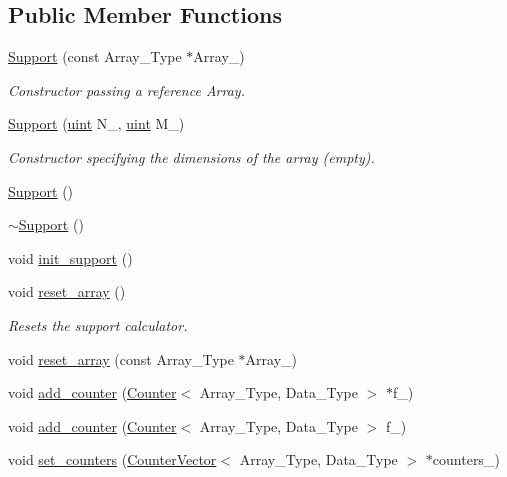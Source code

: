\subsection*{Public Member Functions}
\begin{DoxyCompactItemize}
\item 
\hyperlink{class_support_a4a0587bc6f1f268005a94fea039ea6ba}{Support} (const Array\+\_\+\+Type $\ast$Array\+\_\+)
\begin{DoxyCompactList}\small\item\em Constructor passing a reference Array. \end{DoxyCompactList}\item 
\hyperlink{class_support_aff7d2705d6f765fcbd8958453b7dbefe}{Support} (\hyperlink{typedefs_8hpp_a91ad9478d81a7aaf2593e8d9c3d06a14}{uint} N\+\_\+, \hyperlink{typedefs_8hpp_a91ad9478d81a7aaf2593e8d9c3d06a14}{uint} M\+\_\+)
\begin{DoxyCompactList}\small\item\em Constructor specifying the dimensions of the array (empty). \end{DoxyCompactList}\item 
\hyperlink{class_support_a8366d26b4fcd122cd9139fdee92729a5}{Support} ()
\item 
\hyperlink{class_support_a03228371869980fa356b7b86871d94e8}{$\sim$\+Support} ()
\item 
void \hyperlink{class_support_aef6fda6e7a0989f53fcd252609d770c9}{init\+\_\+support} ()
\item 
void \hyperlink{class_support_a831220076ece01ef72abce7c700b6d9b}{reset\+\_\+array} ()
\begin{DoxyCompactList}\small\item\em Resets the support calculator. \end{DoxyCompactList}\item 
void \hyperlink{class_support_a4b3c832b8a6e84638ff89f346d0454cf}{reset\+\_\+array} (const Array\+\_\+\+Type $\ast$Array\+\_\+)
\item 
void \hyperlink{class_support_a0ad8bb6202451253697d771a28859210}{add\+\_\+counter} (\hyperlink{class_counter}{Counter}$<$ Array\+\_\+\+Type, Data\+\_\+\+Type $>$ $\ast$f\+\_\+)
\item 
void \hyperlink{class_support_aa8680937a0237286a8b0401bca07cbf6}{add\+\_\+counter} (\hyperlink{class_counter}{Counter}$<$ Array\+\_\+\+Type, Data\+\_\+\+Type $>$ f\+\_\+)
\item 
void \hyperlink{class_support_a6933478f6329793a6216e0326e79dff3}{set\+\_\+counters} (\hyperlink{class_counter_vector}{Counter\+Vector}$<$ Array\+\_\+\+Type, Data\+\_\+\+Type $>$ $\ast$counters\+\_\+)

\end{DoxyCompactItemize}
